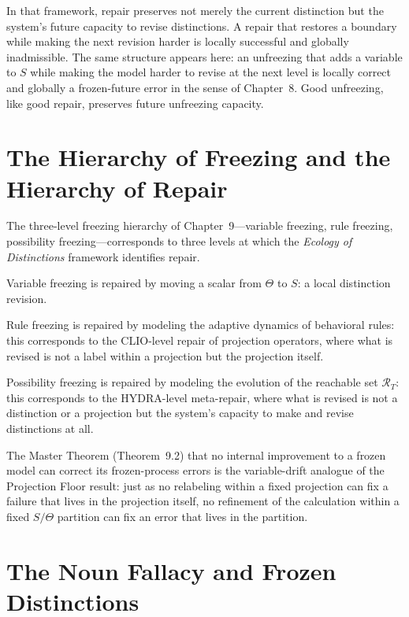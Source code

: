 \documentclass[11pt]{book}
\theoremstyle{plain}
\theoremstyle{definition}
\theoremstyle{remark}
\begin{document}
In that framework, repair preserves not merely the current distinction but the system's future capacity to revise distinctions. A repair that restores a boundary while making the next revision harder is locally successful and globally inadmissible. The same structure appears here: an unfreezing that adds a variable to $S$ while making the model harder to revise at the next level is locally correct and globally a frozen-future error in the sense of Chapter~8. Good unfreezing, like good repair, preserves future unfreezing capacity.

\section*{The Hierarchy of Freezing and the Hierarchy of Repair}

The three-level freezing hierarchy of Chapter~9---variable freezing, rule freezing, possibility freezing---corresponds to three levels at which the \emph{Ecology of Distinctions} framework identifies repair.

Variable freezing is repaired by moving a scalar from $\Theta$ to $S$: a local distinction revision.

Rule freezing is repaired by modeling the adaptive dynamics of behavioral rules: this corresponds to the CLIO-level repair of projection operators, where what is revised is not a label within a projection but the projection itself.

Possibility freezing is repaired by modeling the evolution of the reachable set $\mathcal{R}_T$: this corresponds to the HYDRA-level meta-repair, where what is revised is not a distinction or a projection but the system's capacity to make and revise distinctions at all.

\begin{sloppypar}
The Master Theorem (Theorem~9.2) that no internal improvement to a frozen model can correct its frozen-process errors is the variable-drift analogue of the Projection Floor result: just as no relabeling within a fixed projection can fix a failure that lives in the projection itself, no refinement of the calculation within a fixed $S/\Theta$ partition can fix an error that lives in the partition.
\end{sloppypar}

\section*{The Noun Fallacy and Frozen Distinctions}
\end{document}
